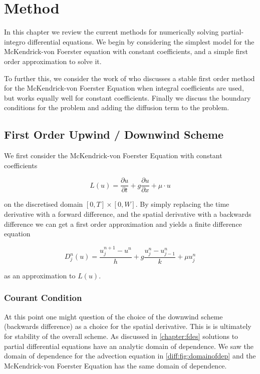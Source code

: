\documentclass[../main.tex]{subfiles}
\begin{document}
  \chapter{Method}\label{chapter:method}

  In this chapter we review the current methods for numerically solving partial-integro differential equations. We begin by considering the simplest model for the McKendrick-von Foerster equation with constant coefficients, and a simple first order approximation to solve it.

  To further this, we consider the work of \cite{hartvig2011} who discusses a stable first order method for the McKendrick-von Foerster Equation when integral coefficients are used, but works equally well for constant coefficients. Finally we discuss the boundary conditions for the problem and adding the diffusion term to the problem.

  \section{First Order Upwind / Downwind Scheme}
  We first consider the McKendrick-von Foerster Equation with constant coefficients

  \begin{equation}
    L(u) = \frac{\partial u}{\partial t} + g \frac{\partial u}{\partial x} + \mu \cdot u
  \end{equation}

  on the discretised domain $[0, T] \times [0, W]$. By simply replacing the time derivative with a forward difference, and the spatial derivative with a backwards difference we can get a first order approximation and yields a finite difference equation

  \begin{equation}
    D^n_j(u) = \frac{u^{n+1}_j - u^n}{h} + g \frac{u^n_{j} - u^n_{j-1}}{k} + \mu u^n_j
  \end{equation}

  as an approximation to $L(u)$.

  \subsection{Courant Condition} \label{method:sec:courant}
  At this point one might question of the choice of the downwind scheme (backwards difference) as a choice for the spatial derivative. This is is ultimately for stability of the overall scheme. As discussed in \autoref{chapter:fdes} solutions to partial differential equations have an analytic domain of dependence. We saw the domain of dependence for the advection equation in \autoref{diff:fig:domainofdep} and the McKendrick-von Foerster Equation has the same domain of dependence.
\end{document}
